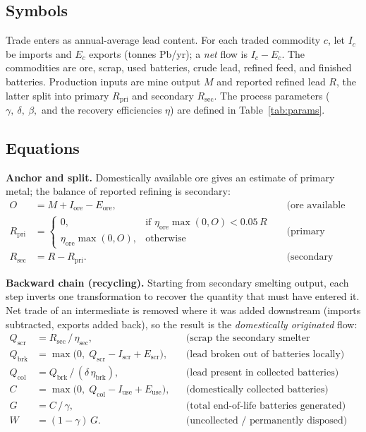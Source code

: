 \documentclass[11pt,a4paper]{article}
\begin{document}
\subsection{Symbols}

Trade enters as annual-average lead content. For each traded commodity $c$, let $I_c$
be imports and $E_c$ exports (tonnes Pb/yr); a \emph{net} flow is $I_c-E_c$. The
commodities are ore, scrap, used batteries, crude lead, refined feed, and finished
batteries. Production inputs are mine output $M$ and reported refined lead $R$, the
latter split into primary $R_{\mathrm{pri}}$ and secondary $R_{\mathrm{sec}}$. The
process parameters ($\gamma,\ \delta,\ \beta,$ and the recovery efficiencies $\eta$)
are defined in Table~\ref{tab:params}.

\subsection{Equations}

\textbf{Anchor and split.} Domestically available ore gives an estimate of primary
metal; the balance of reported refining is secondary:
\begin{align}
O &= M + I_{\mathrm{ore}} - E_{\mathrm{ore}},
   & &\text{(ore available domestically)} \label{eq:ore}\\
R_{\mathrm{pri}} &=
  \begin{cases}
    0, & \text{if } \eta_{\mathrm{ore}}\max(0,O) < 0.05\,R\\[2pt]
    \eta_{\mathrm{ore}}\max(0,O), & \text{otherwise}
  \end{cases}
  & &\text{(primary refined)} \label{eq:split}\\
R_{\mathrm{sec}} &= R - R_{\mathrm{pri}}.
   & &\text{(secondary refined --- the recycling anchor)} \label{eq:sec}
\end{align}

\textbf{Backward chain (recycling).} Starting from secondary smelting output, each step
inverts one transformation to recover the quantity that must have entered it. Net trade
of an intermediate is removed where it was added downstream (imports subtracted,
exports added back), so the result is the \emph{domestically originated} flow:
\begin{align}
Q_{\mathrm{scr}} &= R_{\mathrm{sec}}\,/\,\eta_{\mathrm{sec}},
  & &\text{(scrap the secondary smelter consumed)}\label{eq:b1}\\
Q_{\mathrm{brk}} &= \max\!\big(0,\; Q_{\mathrm{scr}} - I_{\mathrm{scr}} + E_{\mathrm{scr}}\big),
  & &\text{(lead broken out of batteries locally)}\label{eq:b2}\\
Q_{\mathrm{col}} &= Q_{\mathrm{brk}}\,/\,(\delta\,\eta_{\mathrm{brk}}),
  & &\text{(lead present in collected batteries)}\label{eq:b3}\\
C &= \max\!\big(0,\; Q_{\mathrm{col}} - I_{\mathrm{use}} + E_{\mathrm{use}}\big),
  & &\text{(domestically collected batteries)}\label{eq:b4}\\
G &= C\,/\,\gamma,
  & &\text{(total end-of-life batteries generated)}\label{eq:b5}\\
W &= (1-\gamma)\,G.
  & &\text{(uncollected / permanently disposed)}\label{eq:b6}
\end{align}
\end{document}
